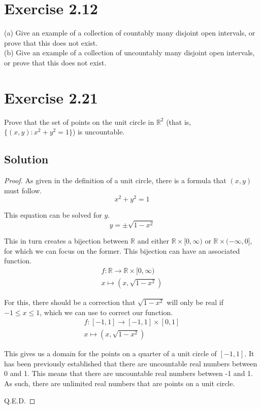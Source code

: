 \documentclass[12pt]{report}
\begin{document}
\pagebreak
\section{Exercise 2.12}
(a) Give an example of a collection of countably many disjoint open intervals, or prove that this does not exist. \\
(b) Give an example of a collection of uncountably many disjoint open intervals, or prove that this does not exist. 

\pagebreak
\section{Exercise 2.21}
Prove that the set of points on the unit circle in $\mathbb{R}^2$ (that is, $\{(x, y): x^2 + y^2 = 1\}$) is uncountable. 

\subsection*{Solution}
\begin{proof}
    As given in the definition of a unit circle, there is a formula that $(x,y)$ must follow.
    \begin{equation}
        x^2 + y^2 = 1
    \end{equation}
    
    This equation can be solved for $y$. 
    \begin{equation}
        y = \pm\sqrt{1 - x^2}
    \end{equation}
    
    This in turn creates a bijection between $\mathbb{R}$ and either $\mathbb{R} \times [0,\infty)$ or $\mathbb{R} \times (-\infty,0]$, for which we can focus on the former.
    This bijection can have an associated function.
    \begin{gather}
        f: \mathbb{R} \to \mathbb{R} \times [0,\infty)\\
        x \mapsto (x, \sqrt{1 - x^2})
    \end{gather}

    For this, there should be a correction that $\sqrt{1 - x^2}$ will only be real if $-1 \leq x \leq 1$, which we can use to correct our function.
    \begin{gather}
        f: [-1,1] \to [-1,1] \times [0,1]\\
        x \mapsto (x, \sqrt{1 - x^2})
    \end{gather}
    
    This gives us a domain for the points on a quarter of a unit circle of $[-1,1]$. 
    It has been previously established that there are uncountable real numbers between 0 and 1. 
    This means that there are uncountable real numbers between -1 and 1.
    As such, there are unlimited real numbers that are points on a unit circle.

    Q.E.D.
\end{proof}
\end{document}
